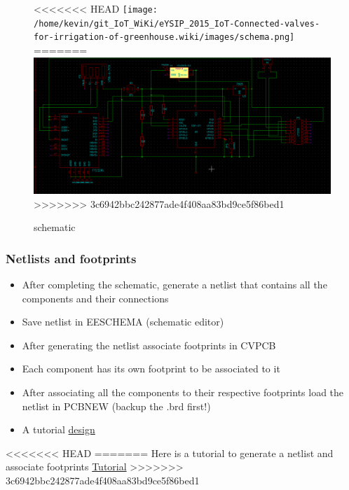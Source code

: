 \documentclass[16pt]{article}
\begin{document}
\begin{figure}

<<<<<<< HEAD
\texttt{[image: /home/kevin/git\_IoT\_WiKi/eYSIP\_2015\_IoT-Connected-valves-for-irrigation-of-greenhouse.wiki/images/schema.png]}
=======
\includegraphics[width=1.2\textwidth]{images/schema.png}
>>>>>>> 3c6942bbc242877ade4f408aa83bd9ce5f86bed1
\caption{schematic}
\end{figure}
\vspace{0.4cm}



\subsubsection{Netlists and
footprints}


\begin{itemize}

\item
  After completing the schematic, generate a netlist that contains all
  the components and their connections
\item
  Save netlist in EESCHEMA (schematic editor)
\item
  After generating the netlist associate footprints in CVPCB
\item
  Each component has its own footprint to be associated to it
\item
  After associating all the components to their respective footprints
  load the netlist in PCBNEW (backup the .brd first!)
\item
  A tutorial
 \href{http://store.curiousinventor.com/guides/kicad/schematic_to_layout}{design}
\end{itemize}



<<<<<<< HEAD
=======
Here is a tutorial to generate a netlist and associate footprints
\href{https://www.youtube.com/watch?v=8HNMihqa844}{Tutorial}
>>>>>>> 3c6942bbc242877ade4f408aa83bd9ce5f86bed1
\end{document}
